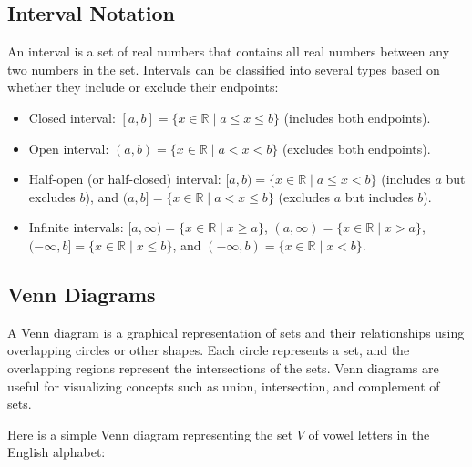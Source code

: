 \subsection{Interval Notation}
\begin{definition}[Interval]
    An interval is a set of real numbers that contains all real numbers between any two numbers in the set. Intervals can be classified into several types based on whether they include or exclude their endpoints:
    \begin{itemize}[itemsep=1pt,label=$\circ$]
        \item Closed interval: $[a, b] = \{x \in \mathbb{R} \mid a \leq x \leq b\}$ (includes both endpoints).
        \item Open interval: $(a, b) = \{x \in \mathbb{R} \mid a < x < b\}$ (excludes both endpoints).
        \item Half-open (or half-closed) interval: $[a, b) = \{x \in \mathbb{R} \mid a \leq x < b\}$ (includes $a$ but excludes $b$), and $(a, b] = \{x \in \mathbb{R} \mid a < x \leq b\}$ (excludes $a$ but includes $b$).
        \item Infinite intervals: $[a, \infty) = \{x \in \mathbb{R} \mid x \geq a\}$, $(a, \infty) = \{x \in \mathbb{R} \mid x > a\}$, $(-\infty, b] = \{x \in \mathbb{R} \mid x \leq b\}$, and $(-\infty, b) = \{x \in \mathbb{R} \mid x < b\}$.
    \end{itemize}
\end{definition}

\subsection{Venn Diagrams}
\begin{definition}
    A Venn diagram is a graphical representation of sets and their relationships using overlapping circles or other shapes. Each circle represents a set, and the overlapping regions represent the intersections of the sets. Venn diagrams are useful for visualizing concepts such as union, intersection, and complement of sets.
\end{definition}

\begin{eg}
    Here is a simple Venn diagram representing the set $V$ of vowel letters in the English alphabet:
    \begin{center}
    \end{center}
\end{eg}

